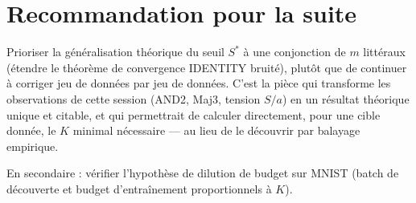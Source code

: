 \documentclass[12pt,a4paper]{article}
\theoremstyle{remark}
\newcommand{\Sstar}{S^{*}}
\begin{document}
\section{Recommandation pour la suite}

Prioriser la généralisation théorique du seuil $\Sstar$ à une conjonction de
$m$ littéraux (étendre le théorème de convergence IDENTITY bruité), plutôt
que de continuer à corriger jeu de données par jeu de données. C'est la
pièce qui transforme les observations de cette session (AND2, Maj3, tension
$S/a$) en un résultat théorique unique et citable, et qui permettrait de
calculer directement, pour une cible donnée, le $K$ minimal nécessaire ---
au lieu de le découvrir par balayage empirique.

En secondaire : vérifier l'hypothèse de dilution de budget sur MNIST (batch
de découverte et budget d'entraînement proportionnels à $K$).
\end{document}
